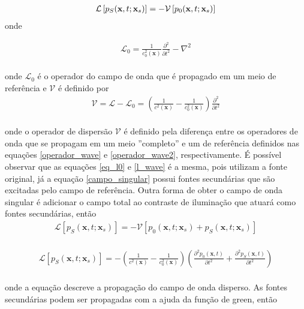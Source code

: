 \begin{eqnarray}
\vspace{-0.5cm}
\mathcal{L} \left[p_{S}(\mathbf{x},t;\mathbf{x}_{s}) \right] = - \mathcal{V} \left[p_{0}(\mathbf{x},t;\mathbf{x}_{s}) \right]
\label{campo_singular}
\end{eqnarray}
onde 

\begin{eqnarray}
     \mathcal{L}_{0} = \frac{1}{c_{0}^{2}(\mathbf{x})} \frac{\partial^{2} }{\partial t^{2}} - \nabla^{2}
     \label{operador_wave2}
\end{eqnarray}
\\
onde $\mathcal{L}_{0}$ é o operador do campo de onda que é propagado em um meio de referência e $\mathcal{V}$ é definido por \\
\begin{eqnarray}
 \mathcal{V} = \mathcal{L} - \mathcal{L}_{0} = \left(\frac{1}{c^{2}(\mathbf{x})} - \frac{1}{c_{0}^{2}(\mathbf{x})} \right) \frac{\partial^{2}}{\partial t^{2}}
\end{eqnarray}
\\
onde o operador de dispersão $\mathcal{V}$ é definido pela diferença entre os operadores de onda que se propagam em um meio ''completo'' e um de referência definidos nas equações \ref{operador_wave} e \ref{operador_wave2}, respectivamente. É possível observar que as equações \ref{eq_l0} e \ref{l_wave} é a mesma, pois utilizam a fonte original, já a equação \ref{campo_singular} possui fontes secundárias que são excitadas pelo campo de referência. Outra forma de obter o campo de onda singular é adicionar o campo total ao contraste de iluminação que atuará como fontes secundárias, então \\
\begin{eqnarray}
\mathcal{L} \left[p_{S}(\mathbf{x},t;\mathbf{x}_{s}) \right] = - \mathcal{V} \left[p_{0}(\mathbf{x},t;\mathbf{x}_{s}) + p_{S}(\mathbf{x},t;\mathbf{x}_{s}) \right]
\end{eqnarray}
\\
\begin{eqnarray}
\nonumber
\mathcal{L} \left[p_{S}(\mathbf{x},t;\mathbf{x}_{s}) \right] = - \left(\frac{1}{c^{2}(\mathbf{x})} - \frac{1}{c_{0}^{2}(\mathbf{x})} \right) \left( \frac{\partial^{2} p_{0}(\mathbf{x},t)}{\partial t^{2}} + \frac{\partial^{2} p_{S}(\mathbf{x},t)}{\partial t^{2}} \right) 
\end{eqnarray}
\\
onde a equação descreve a propagação do campo de onda disperso. As fontes secundárias podem ser propagadas com a ajuda da função de green, então \\
